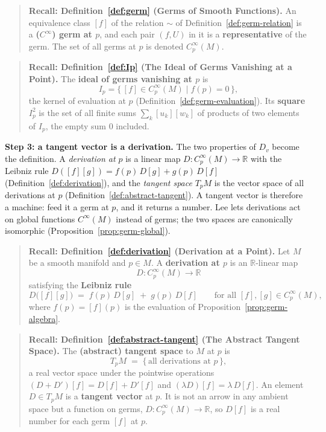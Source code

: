 \documentclass[11pt]{report}
\begin{document}
\begin{quote}
\textbf{Recall: Definition~\ref{def:germ} (Germs of Smooth Functions).} An equivalence class $[f]$ of the relation $\sim$ of Definition~\ref{def:germ-relation} is a \textbf{(}$C^\infty$\textbf{) germ at $p$}, and each pair $(f,U)$ in it is a \textbf{representative} of the germ. The set of all germs at $p$ is denoted $C_p^\infty(M)$.
\end{quote}

\begin{quote}
\textbf{Recall: Definition~\ref{def:Ip} (The Ideal of Germs Vanishing at a Point).} The \textbf{ideal of germs vanishing at $p$} is
\[
I_p = \{\, [f] \in C_p^\infty(M) \mid f(p) = 0 \,\},
\]
the kernel of evaluation at $p$ (Definition~\ref{def:germ-evaluation}). Its \textbf{square} $I_p^2$ is the set of all finite sums $\sum_k [u_k][w_k]$ of products of two elements of $I_p$, the empty sum $0$ included.
\end{quote}

\textbf{Step 3: a tangent vector is a derivation.} The two properties of $D_v$ become the definition. A \emph{derivation at $p$} is a linear map $D : C^\infty_p(M) \to \mathbb{R}$ with the Leibniz rule $D([f][g]) = f(p)\,D[g] + g(p)\,D[f]$ (Definition~\ref{def:derivation}), and the \emph{tangent space} $T_pM$ is the vector space of all derivations at $p$ (Definition~\ref{def:abstract-tangent}). A tangent vector is therefore a machine: feed it a germ at $p$, and it returns a number. Lee lets derivations act on global functions $C^\infty(M)$ instead of germs; the two spaces are canonically isomorphic (Proposition~\ref{prop:germ-global}).

\begin{quote}
\textbf{Recall: Definition~\ref{def:derivation} (Derivation at a Point).} Let $M$ be a smooth manifold and $p \in M$. A \textbf{derivation at $p$} is an $\mathbb{R}$-linear map
\[
D : C_p^\infty(M) \longrightarrow \mathbb{R}
\]
satisfying the \textbf{Leibniz rule}
\[
D\big([f][g]\big) \;=\; f(p)\, D[g] \;+\; g(p)\, D[f] \qquad \text{for all } [f], [g] \in C_p^\infty(M),
\]
where $f(p) = [f](p)$ is the evaluation of Proposition~\ref{prop:germ-algebra}.
\end{quote}

\begin{quote}
\textbf{Recall: Definition~\ref{def:abstract-tangent} (The Abstract Tangent Space).} The \textbf{(abstract) tangent space} to $M$ at $p$ is
\[
T_pM \;=\; \{\, \text{all derivations at } p \,\},
\]
a real vector space under the pointwise operations $(D + D')[f] = D[f] + D'[f]$ and $(\lambda D)[f] = \lambda\, D[f]$. An element $D \in T_pM$ is a \textbf{tangent vector} at $p$. It is not an arrow in any ambient space but a function on germs, $D : C^\infty_p(M) \to \mathbb{R}$, so $D[f]$ is a real number for each germ $[f]$ at $p$.
\end{quote}
\end{document}
